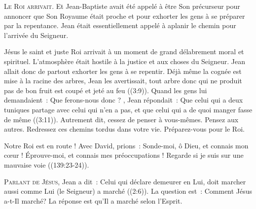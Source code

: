 \lettrine{L}{e Roi arrivait.} Et Jean-Baptiste avait été appelé
 à être Son précurseur \ocadr pour annoncer que Son Royaume
 était proche et pour exhorter les gens à se préparer par la repentance.
 Jean était essentiellement appelé à aplanir le chemin
 pour l'arrivée du Seigneur.


Jésus \ocadr le saint et juste Roi \fcadr{} arrivait à un moment
 de grand délabrement moral et spirituel.
 L'atmosphère était hostile à la justice et aux choses du Seigneur.
 Jean allait donc de partout exhorter les gens à se repentir.
 \og Déjà même la cognée est mise à la racine des arbres, Jean les avertissait,
 tout arbre donc qui ne produit pas de bon fruit est coupé et jeté au feu \fg{}
 ((3:9)). 
 Quand les gens lui demandaient~: 
 \og Que ferons-nous donc ? \fg{}, Jean répondait~: 
 \og Que celui qui a deux tuniques partage avec celui qui n'en a pas,
 et que celui qui a de quoi manger fasse de même \fg{} ((3:11)).
 Autrement dit, cessez de penser à vous-mêmes. Pensez aux autres.
 Redressez ces chemins tordus dans votre vie. Préparez-vous pour le Roi.

Notre Roi est en route ! Avec David, prions~: 
 \og Sonde-moi, ô Dieu, et connais mon cœur !
 Éprouve-moi, et connais mes préoccupations !
 Regarde si je suis sur une mauvaise voie \fg{} ((139:23-24)).

\dvrule






\lettrine{P}{arlant de Jésus,} Jean a dit~: 
 \og Celui qui déclare demeurer en Lui, doit marcher aussi comme Lui
 (le Seigneur) a marché \fg{} ((2:6)). 
 La question est~:  \og Comment Jésus a-t-Il marché? \fg{}
 La réponse est qu'Il a marché selon l'Esprit. 

